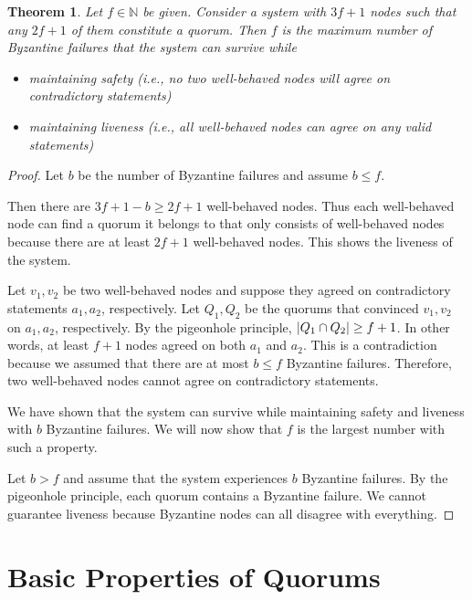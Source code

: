\documentclass[12pt, psamsfonts]{amsart}
\newtheorem{thm}{Theorem}[section]
\theoremstyle{definition}
\theoremstyle{remark}
\numberwithin{equation}{section}
\begin{document}
\begin{thm}
    Let $f \in \mathbb{N}$ be given.
    Consider a system with $3f + 1$ nodes such that any $2f + 1$ of them constitute a quorum.
    Then $f$ is the maximum number of Byzantine failures that the system can survive while
    \begin{itemize}
        \item
            maintaining safety (i.e., no two well-behaved nodes will agree on contradictory statements)
        \item
            maintaining liveness (i.e., all well-behaved nodes can agree on any valid statements)
    \end{itemize}
\end{thm}

\begin{proof}
    Let $b$ be the number of Byzantine failures and assume $b \leq f$.

    Then there are $3f + 1 - b \geq 2f + 1$ well-behaved nodes.
    Thus each well-behaved node can find a quorum it belongs to that only consists of well-behaved nodes because there are at least $2f + 1$ well-behaved nodes.
    This shows the liveness of the system.

    Let $v_1, v_2$ be two well-behaved nodes and suppose they agreed on contradictory statements $a_1, a_2$, respectively.
    Let $Q_1, Q_2$ be the quorums that convinced $v_1, v_2$ on $a_1, a_2$, respectively.
    By the pigeonhole principle, $\abs{Q_1 \cap Q_2} \geq f + 1$.
    In other words, at least $f + 1$ nodes agreed on both $a_1$ and $a_2$.
    This is a contradiction because we assumed that there are at most $b \leq f$ Byzantine failures.
    Therefore, two well-behaved nodes cannot agree on contradictory statements.

    We have shown that the system can survive while maintaining safety and liveness with $b$ Byzantine failures.
    We will now show that $f$ is the largest number with such a property.

    Let $b > f$ and assume that the system experiences $b$ Byzantine failures.
    By the pigeonhole principle, each quorum contains a Byzantine failure.
    We cannot guarantee liveness because Byzantine nodes can all disagree with everything. 
\end{proof}

\section{Basic Properties of Quorums}
\end{document}
